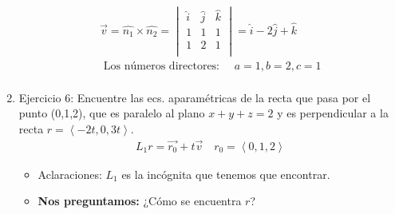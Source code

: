 \begin{enumerate}
\begin{align*}
                \vec{v} = \hat{n_1} \times \hat{n_2} = \begin{vmatrix}
                    \hat{i} & \hat{j} & \hat{k} \\
                    1 & 1 & 1 \\ 
                    1 & 2 & 1 \\ 
                \end{vmatrix}   = \hat{i} -2\hat{j} +\hat{k} \\ 
                \text{  Los números directores:   } \quad a=1, b=2, c= 1 \\ 
            \end{align*}
    
    \item Ejercicio 6: Encuentre las ecs. aparamétricas de la recta que pasa por el punto (0,1,2), que es paralelo al plano $x+y+z=2$ y es perpendicular a la recta $r = \left\langle -2t,0,3t \right\rangle $.
            \begin{align*}
               L_1 r= \vec{r_0}+t \vec{v} \quad r_0 = \left\langle 0,1,2 \right\rangle 
            \end{align*}
            \begin{itemize}
                
                \item Aclaraciones: $L_1$ es la incógnita que tenemos que encontrar.
                \item \textbf{Nos preguntamos:} ¿Cómo se encuentra $r$?
                

\end{itemize}
\end{enumerate}
